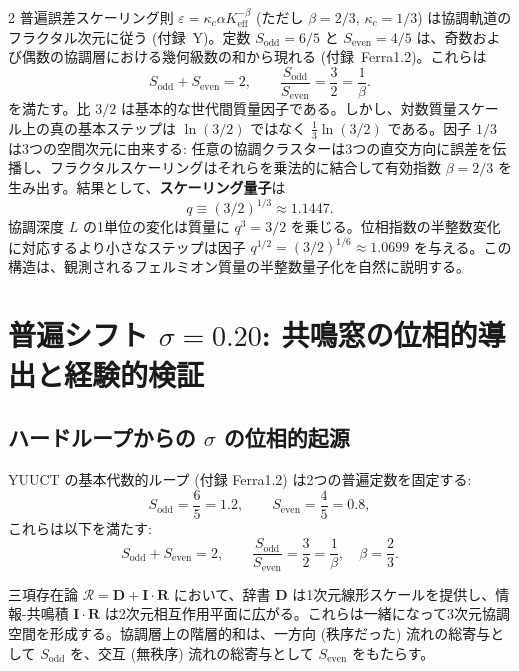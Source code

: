 \documentclass[11pt,a4paper]{article}
\newcommand{\Sodd}{S_{\mathrm{odd}}}
\newcommand{\Seven}{S_{\mathrm{even}}}
\theoremstyle{remark}
\begin{document}
\begin{multicols}{2}
		普遍誤差スケーリング則 \(\varepsilon = \kappa_c \alpha K_{\mathrm{eff}}^{-\beta}\) (ただし \(\beta = 2/3\), \(\kappa_c = 1/3\)) は協調軌道のフラクタル次元に従う (付録~Y)。定数 \(\Sodd = 6/5\) と \(\Seven = 4/5\) は、奇数および偶数の協調層における幾何級数の和から現れる (付録~Ferra1.2)。これらは
		\[
		\Sodd + \Seven = 2, \qquad \frac{\Sodd}{\Seven} = \frac{3}{2} = \frac{1}{\beta}.
		\]
		を満たす。比 \(3/2\) は基本的な世代間質量因子である。しかし、対数質量スケール上の真の基本ステップは \(\ln(3/2)\) ではなく \(\frac{1}{3}\ln(3/2)\) である。因子 \(1/3\) は3つの空間次元に由来する: 任意の協調クラスターは3つの直交方向に誤差を伝播し、フラクタルスケーリングはそれらを乗法的に結合して有効指数 \(\beta = 2/3\) を生み出す。結果として、\textbf{スケーリング量子}は
		\begin{equation}
			q \equiv (3/2)^{1/3} \approx 1.1447.
		\end{equation}
		協調深度 \(L\) の1単位の変化は質量に \(q^3 = 3/2\) を乗じる。位相指数の半整数変化に対応するより小さなステップは因子 \(q^{1/2} = (3/2)^{1/6} \approx 1.0699\) を与える。この構造は、観測されるフェルミオン質量の半整数量子化を自然に説明する。
		
		\section{普遍シフト \(\sigma = 0.20\): 共鳴窓の位相的導出と経験的検証}
		\label{sec:sigma}
		
		\subsection{ハードループからの \(\sigma\) の位相的起源}
		
		YUUCT の基本代数的ループ (付録 Ferra1.2) は2つの普遍定数を固定する:
		\[
		S_{\mathrm{odd}} = \frac{6}{5} = 1.2,\qquad S_{\mathrm{even}} = \frac{4}{5} = 0.8,
		\]
		これらは以下を満たす:
		\[
		S_{\mathrm{odd}} + S_{\mathrm{even}} = 2,\qquad \frac{S_{\mathrm{odd}}}{S_{\mathrm{even}}} = \frac{3}{2} = \frac{1}{\beta},\quad \beta = \frac{2}{3}.
		\]
		
		三項存在論 \( \mathcal{R} = \mathbf{D} + \mathbf{I}\!\cdot\!\mathbf{R} \) において、辞書 \(\mathbf{D}\) は1次元線形スケールを提供し、情報-共鳴積 \(\mathbf{I}\!\cdot\!\mathbf{R}\) は2次元相互作用平面に広がる。これらは一緒になって3次元協調空間を形成する。協調層上の階層的和は、一方向 (秩序だった) 流れの総寄与として \(S_{\mathrm{odd}}\) を、交互 (無秩序) 流れの総寄与として \(S_{\mathrm{even}}\) をもたらす。
		

\end{multicols}
\end{document}
